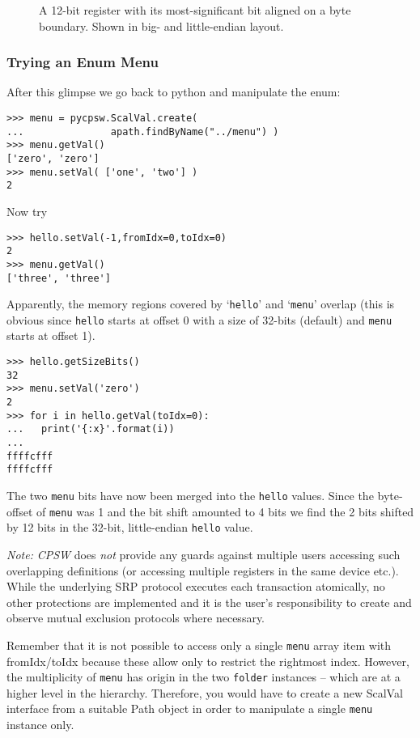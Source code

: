 \documentclass[10pt]{article}
\newcommand{\ita}[1]{\emph{#1}}
\newcommand{\cpsw}      {\ita {CPSW}}
\newcommand{\Path}      {{Path}}
\newcommand{\py}        {python}
\newcommand{\cod}[1] {{\tt#1}}
\newcounter{figs}
\newcommand{\fig}[2]{
\refstepcounter{figs}
\hspace*{\fill}\resizebox{#1}{!}{\texttt{[image: \#2]}}\hspace*{\fill}
}
\begin{document}
\begin{figure}[ht]
\fig{0.95\textwidth}{O.Common/byteorder.pdf}
\label{fig:byteorder}
\caption{A 12-bit register with its most-significant bit aligned on a byte boundary. Shown in big- and little-endian layout.}
\end{figure}

\subsubsection{Trying an Enum Menu}
After this glimpse we go back to \py{} and manipulate the enum:
\begin{verbatim}
>>> menu = pycpsw.ScalVal.create(
...               apath.findByName("../menu") )
>>> menu.getVal()
['zero', 'zero']
>>> menu.setVal( ['one', 'two'] )
2
\end{verbatim}
Now try
\begin{verbatim}
>>> hello.setVal(-1,fromIdx=0,toIdx=0)
2
>>> menu.getVal()
['three', 'three']
\end{verbatim}
Apparently, the memory regions covered by `\cod{hello}' and `\cod{menu}' overlap (this is
obvious since \cod{hello} starts at offset 0 with a size of 32-bits (default)
and \cod{menu} starts at offset 1).
\begin{verbatim}
>>> hello.getSizeBits()
32
>>> menu.setVal('zero')
2
>>> for i in hello.getVal(toIdx=0):
...   print('{:x}'.format(i))
...
ffffcfff
ffffcfff
\end{verbatim}
The two \cod{menu} bits have now been merged into the \cod{hello} values.
Since the byte-offset of \cod{menu} was 1 and the bit shift amounted to 4 bits
we find the 2 bits shifted by 12 bits in the 32-bit, little-endian
\cod{hello} value.

{\em Note:} \cpsw{} does {\em not} provide any guards against multiple users
accessing such overlapping definitions (or accessing multiple registers in the
same device etc.). While the underlying SRP protocol executes each transaction
atomically, no other protections are implemented and it is the user's responsibility
to create and observe mutual exclusion protocols where necessary.

Remember that it is not possible to access only a single \cod{menu} array item
with fromIdx/toIdx because these allow only to restrict the rightmost index.
However, the multiplicity of \cod{menu} has origin in the two \cod{folder} instances
-- which are at a higher level in the hierarchy. Therefore, you would have to create a
new ScalVal interface from a suitable \Path{} object in order to manipulate
a single \cod{menu} instance only.
\end{document}
